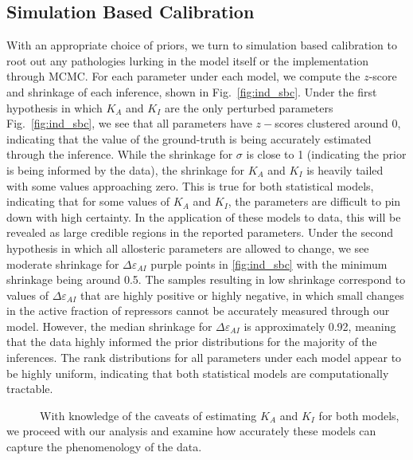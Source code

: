 \documentclass[12pt]{caltech_thesis}
\begin{document}
\hypertarget{simulation-based-calibration-1}{%
\subsection{Simulation Based
Calibration}\label{simulation-based-calibration-1}}

With an appropriate choice of priors, we turn to simulation based
calibration to root out any pathologies lurking in the model itself or
the implementation through MCMC. For each parameter under each model, we
compute the \(z\)-score and shrinkage of each inference, shown in
Fig.~\ref{fig:ind_sbc}. Under the first hypothesis in which \(K_A\) and
\(K_I\) are the only perturbed parameters Fig.~\ref{fig:ind_sbc}, we see
that all parameters have \(z-\)scores clustered around 0, indicating
that the value of the ground-truth is being accurately estimated through
the inference. While the shrinkage for \(\sigma\) is close to 1
(indicating the prior is being informed by the data), the shrinkage for
\(K_A\) and \(K_I\) is heavily tailed with some values approaching zero.
This is true for both statistical models, indicating that for some
values of \(K_A\) and \(K_I\), the parameters are difficult to pin down
with high certainty. In the application of these models to data, this
will be revealed as large credible regions in the reported parameters.
Under the second hypothesis in which all allosteric parameters are
allowed to change, we see moderate shrinkage for
\(\Delta\varepsilon_{AI}\) purple points in \ref{fig:ind_sbc} with the
minimum shrinkage being around 0.5. The samples resulting in low
shrinkage correspond to values of \(\Delta\varepsilon_{AI}\) that are
highly positive or highly negative, in which small changes in the active
fraction of repressors cannot be accurately measured through our model.
However, the median shrinkage for \(\Delta\varepsilon_{AI}\) is
approximately 0.92, meaning that the data highly informed the prior
distributions for the majority of the inferences. The rank distributions
for all parameters under each model appear to be highly uniform,
indicating that both statistical models are computationally tractable.

~~~~~~With knowledge of the caveats of estimating \(K_A\) and \(K_I\)
for both models, we proceed with our analysis and examine how accurately
these models can capture the phenomenology of the data.
\end{document}
